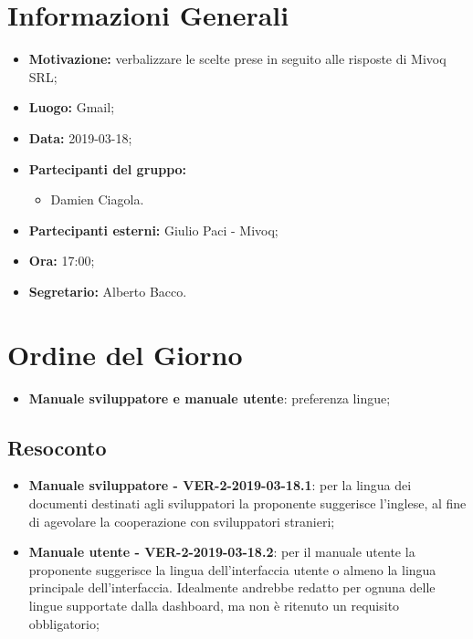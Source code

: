 \documentclass[a4paper, oneside, openany, dvipsnames, table]{article}
\begin{document}
\copertina{}


\newpage
\tableofcontents
\newpage
\section{Informazioni Generali}
\begin{itemize}
\item \textbf{Motivazione:} verbalizzare le scelte prese in seguito alle risposte di Mivoq SRL;
\item \textbf{Luogo:} Gmail;
\item \textbf{Data:} 2019-03-18;
\item \textbf{Partecipanti del gruppo:} \hfill
	\begin{itemize}
	\item Damien Ciagola.
	\end{itemize} 
\item \textbf{Partecipanti esterni:} Giulio Paci - Mivoq;
\item \textbf{Ora:} 17:00;
\item \textbf{Segretario:} Alberto Bacco.
\end{itemize}

\section{Ordine del Giorno}
\begin{itemize}
	\item \textbf{Manuale sviluppatore e manuale utente}: preferenza lingue;

\end{itemize}

\subsection{Resoconto}
\begin{itemize}
	\item \textbf{Manuale sviluppatore - VER-2-2019-03-18.1}: 
	per la lingua dei documenti destinati agli sviluppatori 
	la proponente suggerisce l'inglese, al fine di agevolare la cooperazione 
	con sviluppatori stranieri;
	\item \textbf{Manuale utente - VER-2-2019-03-18.2}:
	per il manuale utente la proponente suggerisce la lingua dell'interfaccia 
	utente o almeno la lingua principale dell'interfaccia.
	Idealmente andrebbe redatto per ognuna delle lingue supportate 
	dalla dashboard, ma non è ritenuto un requisito obbligatorio;	
\end{itemize}
\end{document}
